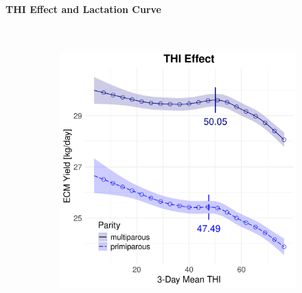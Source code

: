 \newpage
\paragraph{THI Effect and Lactation Curve} \quad \\
\begin{figure}[H]
    \centering
    \begin{subfigure}[b]{0.45\textwidth}
        \centering
        \includegraphics[width=\textwidth]{thesis/figures/models/ecm/after2010/ho_ecm_after2010/ho_ecm_after2010_marginal_thi_milk_combined.png}
    \end{subfigure}
    \hspace{0.05\textwidth} %
    \begin{subfigure}[b]{0.45\textwidth}
        \centering

\end{subfigure}
\end{figure}
